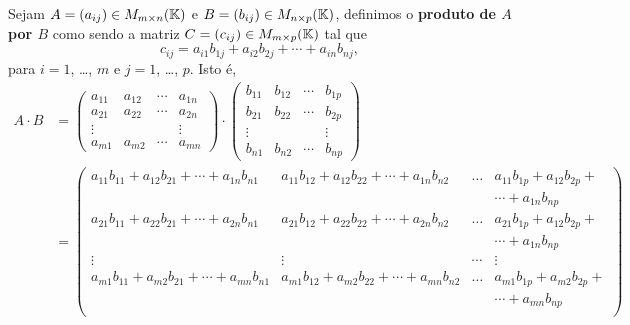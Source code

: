 \begin{definicao}
	Sejam $A = (a_{ij}) \in M_{m\times n}(\mathbb{K})$ e $B = (b_{ij}) \in M_{n\times p}(\mathbb{K})$, definimos o \textbf{produto de $A$ por
    $B$} como sendo a matriz $C = (c_{ij}) \in M_{m\times p}(\mathbb{K})$ tal que
	\[
        c_{ij} = a_{i1}b_{1j} + a_{i2}b_{2j} + \cdots + a_{in}b_{nj},
	\]
	para $i = 1$, \dots, $m$ e $j = 1$, \dots, $p$. Isto \'e,
	\begin{align*}
		A\cdot B &= \begin{pmatrix}
		a_{11} & a_{12} & \cdots & a_{1n}\\
		a_{21} & a_{22} & \cdots & a_{2n}\\
		\vdots & & & \vdots\\
		a_{m1} & a_{m2} & \cdots & a_{mn}
	\end{pmatrix}\cdot \begin{pmatrix}
		b_{11} & b_{12} & \cdots & b_{1p}\\
		b_{21} & b_{22} & \cdots & b_{2p}\\
		\vdots & & & \vdots\\
		b_{n1} & b_{n2} & \cdots & b_{np}
        \end{pmatrix} \\ &= \begin{pmatrix}
        a_{11}b_{11} + a_{12}b_{21} + \cdots + a_{1n}b_{n1} & a_{11}b_{12} + a_{12}b_{22} + \cdots + a_{1n}b_{n2} & \dots & a_{11}b_{1p} +
        a_{12}b_{2p} + \\ & & & \cdots + a_{1n}b_{np}\\
        a_{21}b_{11} + a_{22}b_{21} + \cdots + a_{2n}b_{n1} & a_{21}b_{12} + a_{22}b_{22} + \cdots + a_{2n}b_{n2} & \dots & a_{21}b_{1p} +
        a_{12}b_{2p} +\\ & & & \cdots + a_{1n}b_{np}\\
        \vdots & \vdots & \cdots & \vdots\\
         a_{m1}b_{11} + a_{m2}b_{21} + \cdots + a_{mn}b_{n1} & a_{m1}b_{12} + a_{m2}b_{22} + \cdots + a_{mn}b_{n2} & \dots & a_{m1}b_{1p} +
         a_{m2}b_{2p} + \\ & & & \cdots + a_{mn}b_{np}\\
        \end{pmatrix}
	\end{align*}
\end{definicao}
